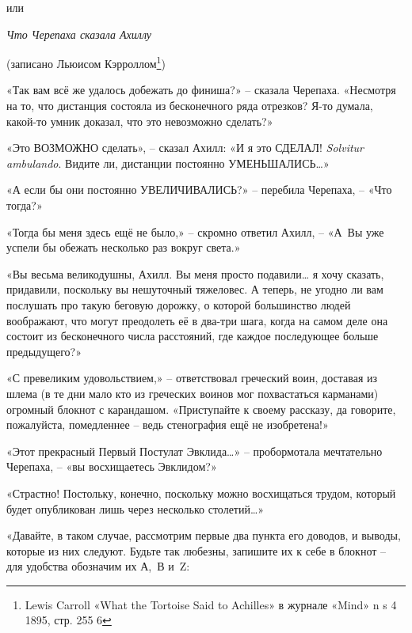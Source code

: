 \documentclass[../main.tex]{subfiles}
\begin{document}

\par\begingroup\centering\Large%
    или

    \emph{Что Черепаха сказала Ахиллу}

    \large%
    (записано Льюисом Кэрроллом\footnote{Lewis Carroll «What the Tortoise Said to Achilles» в журнале «Mind» n s 4 1895, стр. 255 6})
\par\endgroup


«Так вам всё же удалось добежать до финиша?» \--- сказала Черепаха. «Несмотря на то, что дистанция состояла из бесконечного ряда отрезков? Я-то думала, какой-то умник доказал, что это невозможно сделать?»

«Это ВОЗМОЖНО сделать», \--- сказал Ахилл: «И я это СДЕЛАЛ! \emph{Solvitur ambulando}. Видите ли, дистанции постоянно УМЕНЬШАЛИСЬ\ldots»

«А если бы они постоянно УВЕЛИЧИВАЛИСЬ?» \--- перебила Черепаха, \--- «Что тогда?»

«Тогда бы меня здесь ещё не было,» \--- скромно ответил Ахилл, \--- «А~Вы уже успели бы обежать несколько раз вокруг света.»

«Вы весьма великодушны, Ахилл. Вы меня просто подавили\ldots{} я хочу сказать, придавили, поскольку вы нешуточный тяжеловес. А теперь, не угодно ли вам послушать про такую беговую дорожку, о которой большинство людей воображают, что могут преодолеть её в два-три шага, когда на самом деле она состоит из бесконечного числа расстояний, где каждое последующее больше предыдущего?»

«С превеликим удовольствием,» \--- ответствовал греческий воин, доставая из шлема (в те дни мало кто из греческих воинов мог похвастаться карманами) огромный блокнот с карандашом. «Приступайте к своему рассказу, да говорите, пожалуйста, помедленнее \--- ведь стенография ещё не изобретена!»

«Этот прекрасный Первый Постулат Эвклида\ldots» \--- пробормотала мечтательно Черепаха, \--- «вы восхищаетесь Эвклидом?»

«Страстно! Постольку, конечно, поскольку можно восхищаться трудом, который будет опубликован лишь через несколько столетий\ldots»

«Давайте, в таком случае, рассмотрим первые два пункта его доводов, и выводы, которые из них следуют. Будьте так любезны, запишите их к себе в блокнот \--- для удобства обозначим их А,~В и~Z:
\end{document}

